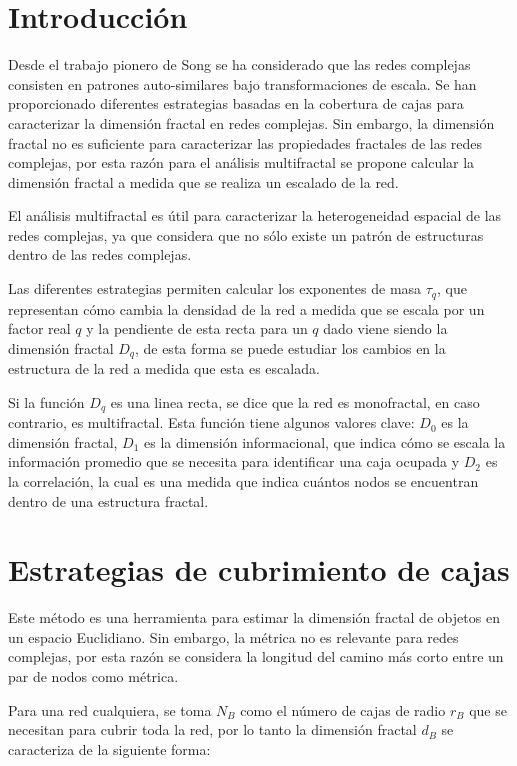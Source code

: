 \section{Introducción}

Desde el trabajo pionero de Song\cite{Song2005} se ha considerado que las redes complejas consisten en patrones auto-similares bajo transformaciones de escala. Se han proporcionado diferentes estrategias basadas en la cobertura de cajas para caracterizar la dimensión fractal en redes complejas. Sin embargo, la dimensión fractal no es suficiente para caracterizar las propiedades fractales de las redes complejas, por esta razón para el análisis multifractal se propone calcular la dimensión fractal a medida que se realiza un escalado de la red.

El análisis multifractal es útil para caracterizar la heterogeneidad espacial de las redes complejas, ya que considera que no sólo existe un patrón de estructuras dentro de las redes complejas.

Las diferentes estrategias permiten calcular los exponentes de masa $\tau_q$, que representan cómo cambia la densidad de la red a medida que se escala por un factor real $q$ y la pendiente de esta recta para un $q$ dado viene siendo la dimensión fractal $D_q$, de esta forma se puede estudiar los cambios en la estructura de la red a medida que esta es escalada.

Si la función $D_q$ es una linea recta, se dice que la red es monofractal, en caso contrario, es multifractal. Esta función tiene algunos valores clave\cite{Halsey1986}: $D_0$ es la dimensión fractal, $D_1$ es la dimensión informacional, que indica cómo se escala la información promedio que se necesita para identificar una caja ocupada y $D_2$ es la correlación, la cual es una medida que indica cuántos nodos se encuentran dentro de una estructura fractal.

\section{Estrategias de cubrimiento de cajas}
\label{cap4:seccionBox}

Este método es una herramienta para estimar la dimensión fractal de objetos en un espacio Euclidiano. Sin embargo, la métrica no es relevante para redes complejas, por esta razón se considera la longitud del camino más corto entre un par de nodos como métrica. 

Para una red cualquiera, se toma $N_B$ como el número de cajas de radio $r_B$ que se necesitan para cubrir toda la red, por lo tanto la dimensión fractal $d_B$ se caracteriza de la siguiente forma:

